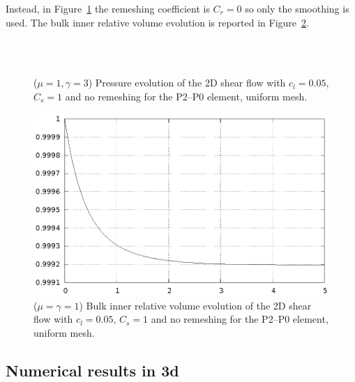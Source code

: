 \documentclass[a4paper,12pt,onecolumn]{article}
\begin{document}
Instead, in Figure~\ref{fig:shear_2d_smooth} the remeshing coefficient is
$C_r=0$ so only the smoothing is used. The bulk inner relative volume evolution
is reported in Figure~\ref{fig:shear_2d_smooth_bulk_inner_volume}.
\begin{figure}[htbp]
  \centering
  \quad
  \\
  \quad
  \\
  \caption{($\mu=1,\gamma=3$) Pressure evolution of the 2D shear flow with
$c_l=0.05$, $C_s=1$ and no remeshing for the P2--P0 element, uniform mesh.}
  \label{fig:shear_2d_smooth}
\end{figure}

\begin{figure}[htbp]
  \centering
  \includegraphics[width=.45\textwidth]
  {figures/2d_shear_smooth_bulk_inner_volume.ps}
  \caption{($\mu=\gamma=1$) Bulk inner relative volume evolution of the 2D
shear flow with $c_l=0.05$, $C_s=1$ and no remeshing for the P2--P0 element,
uniform mesh.}
  \label{fig:shear_2d_smooth_bulk_inner_volume}
\end{figure}

\subsection{Numerical results in 3d} \label{subsec:numerical_results_3d}
\end{document}
